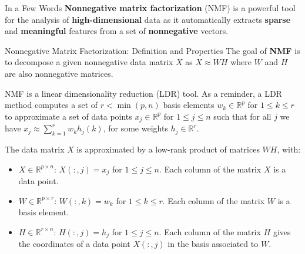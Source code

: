 \documentclass[final]{beamer}
\newlength{\threecolwid}
\newcommand{\real}{\mathbb{R}}
\begin{document}
\begin{frame}
\begin{columns}[t]
\begin{column}{\threecolwid}
\begin{alertblock}{In a Few Words}
\normalsize
\textbf{Nonnegative matrix factorization} (NMF) is a powerful tool for the analysis of \textbf{high-dimensional} data as it automatically extracts \textbf{sparse} and \textbf{meaningful} features from a set of \textbf{nonnegative} vectors.
\end{alertblock}


\begin{exampleblock}{Nonnegative Matrix Factorization: Definition and Properties}
The goal of \textbf{NMF} is to decompose a given nonnegative data matrix $X$ as $X \approx W H$ where $W$ and $H$ are also nonnegative matrices.

NMF is a linear dimensionality reduction (LDR) tool. As a reminder, a LDR method computes a set of $r < \min(p,n)$ basis elements $w_k \in \real^p$ for $1 \leqslant k \leqslant r$ to approximate a set of data points $x_j \in \real^{p}$ for $1 \leqslant j \leqslant n$ such that for all $j$ we have $x_j \approx \sum_{k = 1}^{r} w_{k} h_{j}(k)$, for some weights $h_j\in \real^r$.

The data matrix $X$ is approximated by a low-rank product of matrices $WH$, with:
     \begin{itemize}
     \item $X \in \real^{p \times n}$: $X(:,j) = x_j$ for $1 \leqslant j \leqslant n$. Each column of the matrix $X$ is a data point.
     \item $W \in \real^{p \times r}$: $W(:,k) = w_k$ for $1 \leqslant k \leqslant r$. Each column of the matrix $W$ is a basis element.
     \item $H \in \real^{r \times n}$: $H(:,j) = h_j$ for $1 \leqslant j \leqslant n$. Each column of the matrix \(H\) gives the coordinates of a data point \(X(:,j)\) in the basis associated to \(W\).
     \end{itemize}
\end{exampleblock}





\end{column}
\end{columns}
\end{frame}
\end{document}
